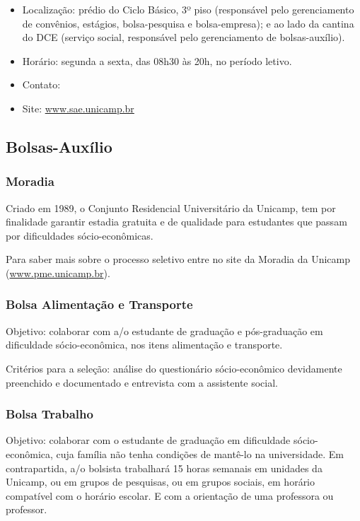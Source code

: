 \begin{itemize}
    \item  Localização: prédio do Ciclo Básico, 3º piso (responsável pelo
        gerenciamento de convênios, estágios, bolsa-pesquisa e bolsa-empresa);
        e ao lado da cantina do DCE (serviço social, responsável pelo
        gerenciamento de bolsas-auxílio).
    \item  Horário: segunda a sexta, das 08h30 às 20h, no período letivo.
    \item  Contato: 
    \item  Site: \url{www.sae.unicamp.br}
\end{itemize}

\subsection{Bolsas-Auxílio}
\subsubsection{Moradia}

Criado em 1989, o Conjunto Residencial Universitário da Unicamp, tem por
finalidade garantir estadia gratuita e de qualidade para estudantes que passam
por dificuldades sócio-econômicas.

Para saber mais sobre o processo seletivo entre no site da Moradia da Unicamp
(\url{www.pme.unicamp.br}).

\subsubsection{Bolsa Alimentação e Transporte}

Objetivo: colaborar com a/o estudante de graduação e pós-graduação em
dificuldade só\-cio-\-e\-co\-nô\-mi\-ca, nos itens alimentação e transporte.

Critérios para a seleção: análise do questionário só\-cio-\-e\-co\-nô\-mi\-co
devidamente preenchido e documentado e entrevista com a assistente social.

\subsubsection{Bolsa Trabalho}

Objetivo: colaborar com o estudante de graduação em dificuldade
sócio-econômica, cuja família não tenha condições de mantê-lo na universidade.
Em contrapartida, a/o bolsista trabalhará 15 horas semanais em unidades da
Unicamp, ou em grupos de pesquisas, ou em grupos sociais, em horário compatível
com o horário escolar. E com a orientação de uma professora ou professor.

